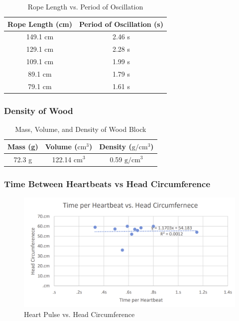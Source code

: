 \documentclass{article}
\begin{document}
\begin{table}[H]
\centering
\begin{tabular}{|c|c|}
    \hline
    \rowcolor{black}
    \color{white} Rope Length (cm) & \color{white} Period of Oscillation (s) \\
    \hline
    149.1 cm & 2.46 s \\
    \hline
    129.1 cm & 2.28 s \\
    \hline
    109.1 cm & 1.99 s \\
    \hline
    89.1 cm  & 1.79 s \\
    \hline
    79.1 cm  & 1.61 s \\

    \hline
\end{tabular} 
\caption{Rope Length vs. Period of Oscillation}
\end{table}

\subsubsection{Density of Wood}
\begin{table}[H]
\centering
\begin{tabular}{|c|c|c|}
    \hline
    \rowcolor{black}
    \color{white} Mass (g) & \color{white} Volume ($\mathrm{cm}^3$) & \color{white} Density ($\mathrm{g}/\mathrm{cm}^3$) \\
    \hline
    72.3 g & 122.14 $\mathrm{cm}^3$ & 0.59 $\mathrm{g}/\mathrm{cm}^3$ \\

    \hline
\end{tabular} 
\caption{Mass, Volume, and Density of Wood Block}
\end{table}

\subsubsection{Time Between Heartbeats vs Head Circumference}
\begin{figure}[H]
    \includegraphics[width=16cm]{lab1_plot2.png}
    \caption{Heart Pulse vs. Head Circumference}
    \label{plot:3}
\end{figure}
\end{document}
